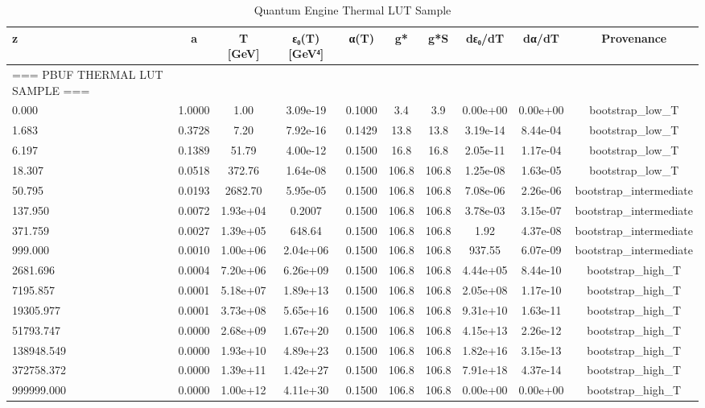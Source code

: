 \begin{table}[htbp]
\centering
\caption{Quantum Engine Thermal LUT Sample}
\label{tab:quantum_engine_thermal_lut_sample}
\begin{tabular}{lccccccccc}
\hline
z & a & T [GeV] & ε₀(T) [GeV⁴] & α(T) & g* & g*S & dε₀/dT & dα/dT & Provenance \\
\hline
=== PBUF THERMAL LUT SAMPLE === &  &  &  &  &  &  &  &  &  \\
0.000 & 1.0000 & 1.00 & 3.09e-19 & 0.1000 & 3.4 & 3.9 & 0.00e+00 & 0.00e+00 & bootstrap_low_T \\
1.683 & 0.3728 & 7.20 & 7.92e-16 & 0.1429 & 13.8 & 13.8 & 3.19e-14 & 8.44e-04 & bootstrap_low_T \\
6.197 & 0.1389 & 51.79 & 4.00e-12 & 0.1500 & 16.8 & 16.8 & 2.05e-11 & 1.17e-04 & bootstrap_low_T \\
18.307 & 0.0518 & 372.76 & 1.64e-08 & 0.1500 & 106.8 & 106.8 & 1.25e-08 & 1.63e-05 & bootstrap_low_T \\
50.795 & 0.0193 & 2682.70 & 5.95e-05 & 0.1500 & 106.8 & 106.8 & 7.08e-06 & 2.26e-06 & bootstrap_intermediate \\
137.950 & 0.0072 & 1.93e+04 & 0.2007 & 0.1500 & 106.8 & 106.8 & 3.78e-03 & 3.15e-07 & bootstrap_intermediate \\
371.759 & 0.0027 & 1.39e+05 & 648.64 & 0.1500 & 106.8 & 106.8 & 1.92 & 4.37e-08 & bootstrap_intermediate \\
999.000 & 0.0010 & 1.00e+06 & 2.04e+06 & 0.1500 & 106.8 & 106.8 & 937.55 & 6.07e-09 & bootstrap_intermediate \\
2681.696 & 0.0004 & 7.20e+06 & 6.26e+09 & 0.1500 & 106.8 & 106.8 & 4.44e+05 & 8.44e-10 & bootstrap_high_T \\
7195.857 & 0.0001 & 5.18e+07 & 1.89e+13 & 0.1500 & 106.8 & 106.8 & 2.05e+08 & 1.17e-10 & bootstrap_high_T \\
19305.977 & 0.0001 & 3.73e+08 & 5.65e+16 & 0.1500 & 106.8 & 106.8 & 9.31e+10 & 1.63e-11 & bootstrap_high_T \\
51793.747 & 0.0000 & 2.68e+09 & 1.67e+20 & 0.1500 & 106.8 & 106.8 & 4.15e+13 & 2.26e-12 & bootstrap_high_T \\
138948.549 & 0.0000 & 1.93e+10 & 4.89e+23 & 0.1500 & 106.8 & 106.8 & 1.82e+16 & 3.15e-13 & bootstrap_high_T \\
372758.372 & 0.0000 & 1.39e+11 & 1.42e+27 & 0.1500 & 106.8 & 106.8 & 7.91e+18 & 4.37e-14 & bootstrap_high_T \\
999999.000 & 0.0000 & 1.00e+12 & 4.11e+30 & 0.1500 & 106.8 & 106.8 & 0.00e+00 & 0.00e+00 & bootstrap_high_T \\

\end{tabular}
\end{table}
